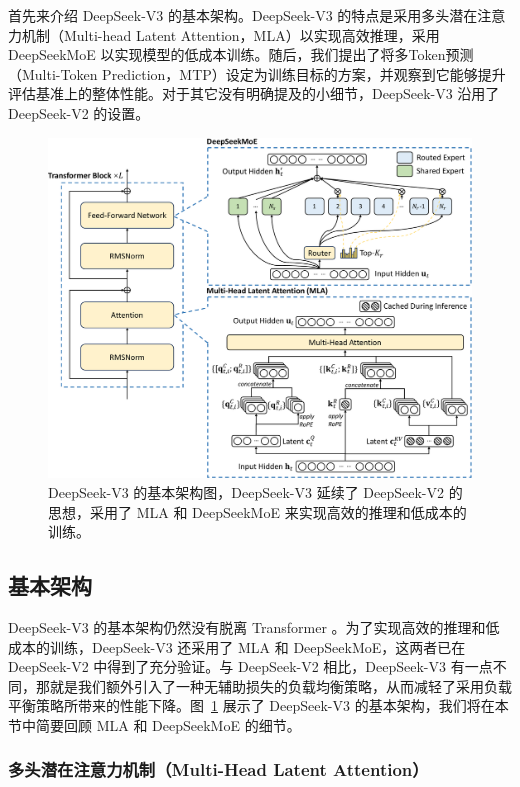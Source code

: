 \documentclass[lang=cn,a4paper,newtx]{elegantpaper}
\newcommand{\dsvii}{DeepSeek-V2}
\newcommand{\dsattn}{MLA}
\newcommand{\dsmoe}{DeepSeekMoE}
\newcommand{\dsviii}{DeepSeek-V3}
\begin{document}
首先来介绍 \dsviii{} 的基本架构。\dsviii{} 的特点是采用多头潜在注意力机制（Multi-head Latent Attention，\dsattn{}）以实现高效推理，采用 \dsmoe{} 以实现模型的低成本训练。随后，我们提出了将多Token预测（Multi-Token Prediction，MTP）设定为训练目标的方案，并观察到它能够提升评估基准上的整体性能。对于其它没有明确提及的小细节，\dsviii{} 沿用了 \dsvii{} 的设置。

\begin{figure}[!t]
\centering
\includegraphics[width=0.99\linewidth]{figures/basic_arch.pdf}
\caption{
    \dsviii{} 的基本架构图，\dsviii{} 延续了 \dsvii{} 的思想，采用了 \dsattn{} 和 \dsmoe{} 来实现高效的推理和低成本的训练。
}
\label{fig:basic_arch}
\end{figure}

\subsection{基本架构}

\dsviii{} 的基本架构仍然没有脱离 Transformer 。为了实现高效的推理和低成本的训练，\dsviii{} 还采用了 \dsattn{} 和 \dsmoe{}，这两者已在 \dsvii{} 中得到了充分验证。与 \dsvii{} 相比，\dsviii{} 有一点不同，那就是我们额外引入了一种无辅助损失的负载均衡策略，从而减轻了采用负载平衡策略所带来的性能下降。图~\ref{fig:basic_arch} 展示了 \dsviii{} 的基本架构，我们将在本节中简要回顾 MLA 和 DeepSeekMoE 的细节。

\subsubsection{多头潜在注意力机制（Multi-Head Latent Attention）}
\end{document}
